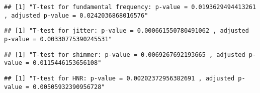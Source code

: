 \documentclass[
]{article}
\newenvironment{Shaded}{\begin{snugshade}}{\end{snugshade}}
\newcommand{\DecValTok}[1]{\textcolor[rgb]{0.00,0.00,0.81}{#1}}
\newcommand{\FunctionTok}[1]{\textcolor[rgb]{0.00,0.00,0.00}{#1}}
\newcommand{\NormalTok}[1]{#1}
\newcommand{\SpecialCharTok}[1]{\textcolor[rgb]{0.00,0.00,0.00}{#1}}
\newcommand{\StringTok}[1]{\textcolor[rgb]{0.31,0.60,0.02}{#1}}
\begin{document}
\begin{verbatim}
## [1] "T-test for fundamental frequency: p-value = 0.0193629494413261 , adjusted p-value = 0.0242036868016576"
\end{verbatim}

\begin{Shaded}
\end{Shaded}

\begin{verbatim}
## [1] "T-test for jitter: p-value = 0.000661550780491062 , adjusted p-value = 0.00330775390245531"
\end{verbatim}

\begin{Shaded}
\end{Shaded}

\begin{verbatim}
## [1] "T-test for shimmer: p-value = 0.0069267692193665 , adjusted p-value = 0.0115446153656108"
\end{verbatim}

\begin{Shaded}
\end{Shaded}

\begin{verbatim}
## [1] "T-test for HNR: p-value = 0.00202372956382691 , adjusted p-value = 0.00505932390956728"
\end{verbatim}
\end{document}
